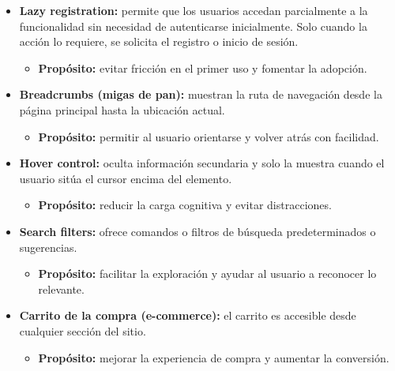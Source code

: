 \begin{itemize}

    \item \textbf{Lazy registration:} permite que los usuarios accedan parcialmente a la funcionalidad sin necesidad de autenticarse inicialmente.
    Solo cuando la acción lo requiere, se solicita el registro o inicio de sesión.

    \begin{itemize}

        \item \textbf{Propósito:} evitar fricción en el primer uso y fomentar la adopción.

    \end{itemize}
    \item \textbf{Breadcrumbs (migas de pan):} muestran la ruta de navegación desde la página principal hasta la ubicación actual.
    \begin{itemize}
        \item \textbf{Propósito:} permitir al usuario orientarse y volver atrás con facilidad.
    \end{itemize}

    \item \textbf{Hover control:} oculta información secundaria y solo la muestra cuando el usuario sitúa el cursor encima del elemento.
    \begin{itemize}
        \item \textbf{Propósito:} reducir la carga cognitiva y evitar distracciones.
    \end{itemize}

    \item \textbf{Search filters:} ofrece comandos o filtros de búsqueda predeterminados o sugerencias.
    \begin{itemize}
        \item \textbf{Propósito:} facilitar la exploración y ayudar al usuario a reconocer lo relevante.
    \end{itemize}

    \item \textbf{Carrito de la compra (e-commerce):} el carrito es accesible desde cualquier sección del sitio.
    \begin{itemize}
        \item \textbf{Propósito:} mejorar la experiencia de compra y aumentar la conversión.
    \end{itemize}
\end{itemize}

